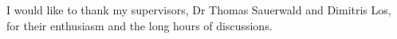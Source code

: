\begin{acknowledgements}      


I would like to thank my supervisors, Dr Thomas Sauerwald and Dimitris Los, for their enthusiasm and the long hours of discussions.


\end{acknowledgements}
